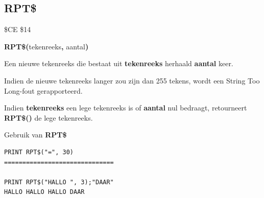 \subsection{RPT\$}
\begin{description}[leftmargin=2cm,style=nextline]
\item [Token:]    \$CE \$14

\item [Formaat:]   {\bf RPT\$(}tekenreeks{\bf,} aantal{\bf)}

\item [Retourneert:]  Een nieuwe tekenreeks die bestaat uit {\bf tekenreeks} herhaald {\bf aantal} keer.

\item [Opmerkingen:]  Indien de nieuwe tekenreeks langer zou zijn dan 255 tekens, wordt een String Too Long-fout gerapporteerd.

Indien {\bf tekenreeks} een lege tekenreeks is of {\bf aantal} nul bedraagt, retourneert {\bf RPT\$()} de lege tekenreeks.

\item [Voorbeeld:]  Gebruik van {\bf RPT\$}

\begin{tcolorbox}[colback=black,coltext=white]
\verbatimfont{\codefont}
\begin{verbatim}
PRINT RPT$("=", 30)
==============================

PRINT RPT$("HALLO ", 3);"DAAR"
HALLO HALLO HALLO DAAR
\end{verbatim}
\end{tcolorbox}
\end{description}



\newpage

